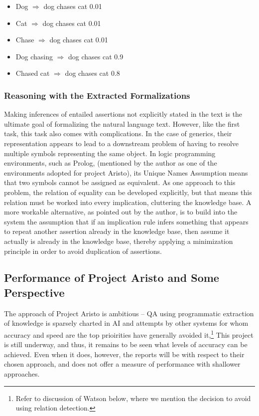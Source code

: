 \begin{itemize}
\item Dog $\Rightarrow$ dog chases cat 0.01
\item Cat $\Rightarrow$ dog chases cat 0.01
\item Chase $\Rightarrow$ dog chases cat 0.01
\item Dog chasing $\Rightarrow$ dog chases cat 0.9
\item Chased cat $\Rightarrow$ dog chases cat 0.8 \cite{clark2015elementary}
\end{itemize}

\subsubsection{Reasoning with the Extracted Formalizations}

Making inferences of entailed assertions not explicitly stated in the text is the ultimate goal of formalizing the natural language text.  However, like the first task, this task also comes with complications.  In the case of generics, their representation appears to lead to a downstream problem of having to resolve multiple symbols representing the same object.  In logic programming environments, such as Prolog, \cite{blackburn_2006_prolog_ch1,blackburn_2006_prolog_ch2,blackburn_2006_prolog_ch3,blackburn_2006_prolog_ch4,blackburn_2006_prolog_ch5,blackburn_2006_prolog_ch6} (mentioned by the author as one of the environments adopted for project Aristo), its Unique Names Assumption means that two symbols cannot be assigned as equivalent.  As one approach to this problem, the relation of equality can be developed explicitly, but that means this relation must be worked into every implication, cluttering the knowledge base.  A more workable alternative, as pointed out by the author, is to build into the system the assumption that if an implication rule infers something that appears to repeat another assertion already in the knowledge base, then assume it actually is already in the knowledge base, thereby applying a minimization principle in order to avoid duplication of assertions.

\subsection{Performance of Project Aristo and Some Perspective}

The approach of Project Aristo is ambitious -- QA using programmatic extraction of knowledge is sparsely charted in AI and attempts by other systems for whom accuracy and speed are the top prioirities have generally avoided it,\footnote{Refer to discussion of Watson below, where we mention the decision to avoid using relation detection.}  This project is still underway, and thus, it remains to be seen what levels of accuracy can be achieved.  Even when it does, however, the reports will be with respect to their chosen approach, and does not offer a measure of performance with shallower approaches.


